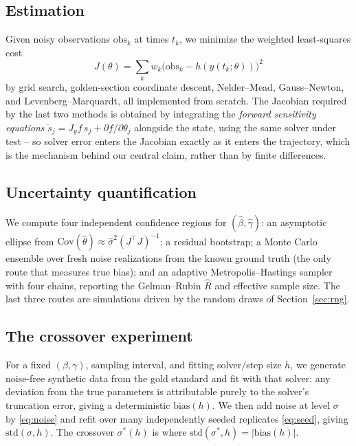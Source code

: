 \subsection{Estimation}
Given noisy observations $\mathrm{obs}_k$ at times $t_k$, we minimize the weighted least-squares cost
\begin{equation}
  J(\theta) = \sum_k w_k \big(\mathrm{obs}_k - h(y(t_k;\theta))\big)^2 \label{eq:cost}
\end{equation}
by grid search, golden-section coordinate descent, Nelder--Mead, Gauss--Newton, and
Levenberg--Marquardt, all implemented from scratch. The Jacobian required by the last two methods is
obtained by integrating the \emph{forward sensitivity equations}
$\dot s_j = J_y f \, s_j + \partial f/\partial\theta_j$ alongside the state, using the same solver
under test -- so solver error enters the Jacobian exactly as it enters the trajectory, which is the
mechanism behind our central claim, rather than by finite differences.





\subsection{Uncertainty quantification}
We compute four independent confidence regions for $(\hat\beta,\hat\gamma)$: an asymptotic ellipse
from $\mathrm{Cov}(\hat\theta) \approx \hat\sigma^2 (J^\top J)^{-1}$; a residual bootstrap; a Monte
Carlo ensemble over fresh noise realizations from the known ground truth (the only route that
measures true bias); and an adaptive Metropolis--Hastings sampler with four chains, reporting the
Gelman--Rubin $\hat R$ and effective sample size. The last three routes are simulations driven by
the random draws of Section~\ref{sec:rng}.

\subsection{The crossover experiment}
For a fixed $(\beta,\gamma)$, sampling interval, and fitting solver/step size $h$, we generate
noise-free synthetic data from the gold standard and fit with that solver: any deviation from the
true parameters is attributable purely to the solver's truncation error, giving a deterministic
$\mathrm{bias}(h)$. We then add noise at level $\sigma$ by \eqref{eq:noise} and refit over many
independently seeded replicates \eqref{eq:seed}, giving
$\mathrm{std}(\sigma, h)$. The crossover $\sigma^*(h)$ is where $\mathrm{std}(\sigma^*, h) =
|\mathrm{bias}(h)|$.
